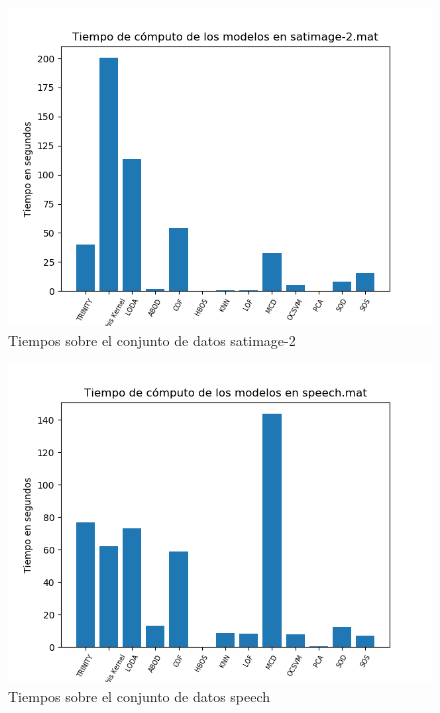 \begin{figure}[H]
	\centering
	\label{satimage-2_times}
	\includegraphics[scale=0.7]{imagenes/imgs-exp1/times/satimage-2}
	\caption{Tiempos sobre el conjunto de datos satimage-2}
\end{figure}

\begin{figure}[H]
	\centering
	\label{speech_times}
	\includegraphics[scale=0.7]{imagenes/imgs-exp1/times/speech}
	\caption{Tiempos sobre el conjunto de datos speech}
\end{figure}

